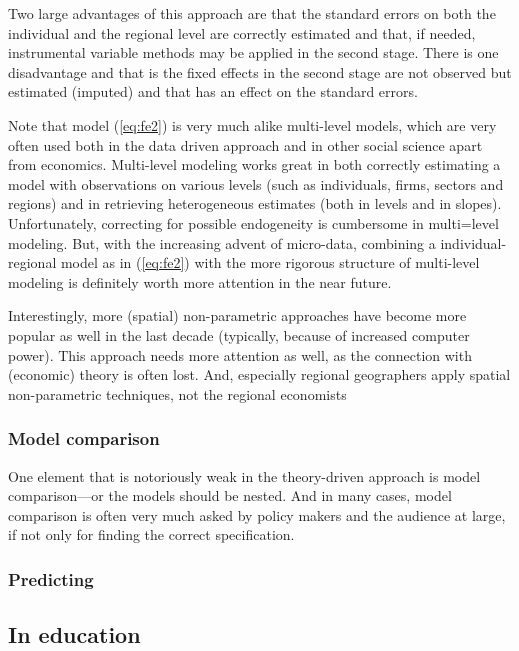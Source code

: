 \documentclass[fleqn,10pt]{SelfArx} %
\begin{document}
Two large advantages of this approach are that the standard errors on both the
individual and the regional level are correctly estimated and that, if needed,
instrumental variable methods may be applied in the second stage. There is one
disadvantage and that is the fixed effects in the second stage are not observed
but estimated (imputed) and that has an effect on the standard errors.

Note that model (\ref{eq:fe2}) is very much alike multi-level models, which are
very often used both in the data driven approach and in other social science
apart from economics. Multi-level modeling works great in both correctly
estimating a model with observations on various levels (such as individuals, firms,
sectors and regions) and in retrieving heterogeneous estimates (both in levels
and in slopes). Unfortunately, correcting for possible endogeneity is cumbersome
in multi=level modeling. But, with the increasing advent of micro-data,
combining a individual-regional model as in (\ref{eq:fe2}) with the more
rigorous structure of multi-level modeling is definitely worth more attention in
the near future. 

Interestingly, more (spatial) non-parametric approaches \citep[see, e.g., the
geograpically weighted regression exercise in]{Thissen2016} have become more
popular as well in the last decade (typically, because of increased computer
power). This approach needs more attention as well, as the connection with
(economic) theory is often lost. And, especially regional geographers apply
spatial non-parametric techniques, not the regional economists 

\subsubsection{Model comparison}

One element that is notoriously weak in the theory-driven approach is model
comparison---or the models should be nested. And in many cases, model comparison
is often very much asked by policy makers and the audience at large, if not only
for finding the correct specification. 

\subsubsection{Predicting}


\subsection{In education}
\end{document}
